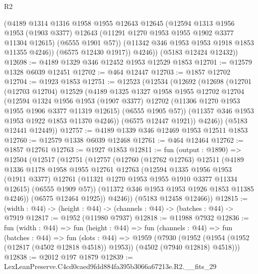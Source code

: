 \begin{lexlean}{R2}
\begin{coremodule}
            (@4189
              @1314
              @1316
              @1958
              @1955
              @12643
              @12645
              (@12594
                @1313
                @1956
                @1953
                (@1903 @3377)
                @12643
                (@11291 @1270 @1953 @1955 @1902 @3377 @11304 @12615)
                (@6555 @1901 @57))
              (@11342 @346 @1953 @1953 @1918 @1853 @11355 @4246))
            (@6575 @12430 @1917))
          @4246))
      (@5183 @12424 @12432))
@12698 := @4189 @1329 @346 @12452 @1953 @12529 @1853
@12701 := @12579 @1328 @6039 @12451
@12702 := @464 @12447
@12703 := @1857 @12702
@12704 := @1923 @1853
@12751 := @12523
    (@12534
      (@12692
        (@12698
          (@12701
            (@12703 @12704)
            @12529
            (@4189
              @1325
              @1327
              @1958
              @1955
              @12702
              @12704
              (@12594
                @1324
                @1956
                @1953
                (@1907 @3377)
                @12702
                (@11306 @1270 @1953 @1955 @1906 @3377 @11319 @12615)
                (@6555 @1905 @57))
              (@11357 @346 @1953 @1953 @1922 @1853 @11370 @4246))
            (@6575 @12447 @1921))
          @4246))
      (@5183 @12441 @12449))
@12757 := @4189 @1339 @346 @12469 @1953 @12511 @1853
@12760 := @12579 @1338 @6039 @12468
@12761 := @464 @12464
@12762 := @1857 @12761
@12763 := @1927 @1853
@12811 := fun (output : @1890) =>
  @12504
    (@12517
      (@12751
        (@12757
          (@12760
            (@12762 @12763)
            @12511
            (@4189
              @1336
              @1178
              @1958
              @1955
              @12761
              @12763
              (@12594
                @1335
                @1956
                @1953
                (@1911 @3377)
                @12761
                (@11321 @1270 @1953 @1955 @1910 @3377 @11334 @12615)
                (@6555 @1909 @57))
              (@11372 @346 @1953 @1953 @1926 @1853 @11385 @4246))
            (@6575 @12464 @1925))
          @4246))
      (@5183 @12458 @12466))
@12815 := (width : @44) -> (height : @44) -> (channels : @44) -> (batches : @44) -> @7919
@12817 := @1952 (@11980 @7937)
@12818 := @11988 @7932
@12836 := fun (width : @44) =>
  fun (height : @44) =>
  fun (channels : @44) =>
  fun (batches : @44) =>
  fun (slots : @44) =>
  @1959
    (@7930 (@1952 (@1954 (@1952 (@12817 (@4502 @12818 @4518)) @1953)) (@4502 (@7940 @12818) @4518)))
@12838 := @2012 @197 @1879
@12839 := LexLeanPreserve.C4cd0caed9fdd884fa395b3066a67213e.R2.__fits_29

\end{coremodule}
\end{lexlean}

